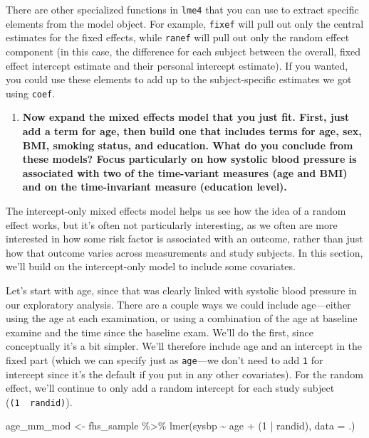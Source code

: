 \documentclass[
]{book}
\newenvironment{Shaded}{\begin{snugshade}}{\end{snugshade}}
\newcommand{\AttributeTok}[1]{\textcolor[rgb]{0.77,0.63,0.00}{#1}}
\newcommand{\DecValTok}[1]{\textcolor[rgb]{0.00,0.00,0.81}{#1}}
\newcommand{\FunctionTok}[1]{\textcolor[rgb]{0.00,0.00,0.00}{#1}}
\newcommand{\NormalTok}[1]{#1}
\newcommand{\OtherTok}[1]{\textcolor[rgb]{0.56,0.35,0.01}{#1}}
\newcommand{\SpecialCharTok}[1]{\textcolor[rgb]{0.00,0.00,0.00}{#1}}
\providecommand{\tightlist}{%
  \setlength{\itemsep}{0pt}\setlength{\parskip}{0pt}}
\begin{document}
There are other specialized functions in \texttt{lme4} that you can use to extract
specific elements from the model object. For example, \texttt{fixef} will pull out only
the central estimates for the fixed effects, while \texttt{ranef} will pull out only
the random effect component (in this case, the difference for each subject
between the overall, fixed effect intercept estimate and their personal intercept
estimate). If you wanted, you could use these elements to add up to the
subject-specific estimates we got using \texttt{coef}.

\begin{enumerate}
\def\labelenumi{\arabic{enumi}.}
\setcounter{enumi}{2}
\tightlist
\item
  \textbf{Now expand the mixed effects model that you just fit. First, just add a
  term for age, then build one that includes terms for age, sex, BMI, smoking
  status, and education. What do you conclude from these models? Focus
  particularly on how systolic blood pressure is associated with two of the
  time-variant measures (age and BMI) and on the time-invariant measure (education
  level).}
\end{enumerate}

The intercept-only mixed effects model helps us see how the idea of a random
effect works, but it's often not particularly interesting, as we often are
more interested in how some risk factor is associated with an outcome, rather
than just how that outcome varies across measurements and study subjects.
In this section, we'll build on the intercept-only model to include some
covariates.

Let's start with age, since that was clearly linked with systolic blood pressure
in our exploratory analysis. There are a couple ways we could include
age---either using the age at each examination, or using a combination of the
age at baseline examine and the time since the baseline exam. We'll do the
first, since conceptually it's a bit simpler. We'll therefore include age and an
intercept in the fixed part (which we can specify just as \texttt{age}---we don't need
to add \texttt{1} for intercept since it's the default if you put in any other
covariates). For the random effect, we'll continue to only add a random
intercept for each study subject (\texttt{(1\ \textbar{}\ randid)}).

\begin{Shaded}
\begin{Highlighting}[]
\NormalTok{age\_mm\_mod }\OtherTok{\textless{}{-}}\NormalTok{ fhs\_sample }\SpecialCharTok{\%\textgreater{}\%} 
  \FunctionTok{lmer}\NormalTok{(sysbp }\SpecialCharTok{\textasciitilde{}}\NormalTok{ age }\SpecialCharTok{+}\NormalTok{ (}\DecValTok{1} \SpecialCharTok{|}\NormalTok{ randid), }\AttributeTok{data =}\NormalTok{ .) }
\end{Highlighting}
\end{Shaded}
\end{document}
